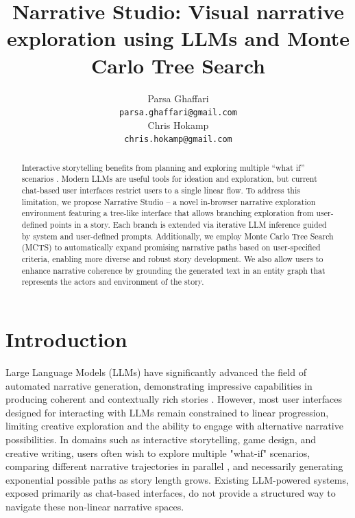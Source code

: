 \documentclass[11pt]{article}
\title{\textbf{Narrative Studio}: Visual narrative exploration using LLMs and Monte Carlo Tree Search}
\author{Parsa Ghaffari \\
  \texttt{parsa.ghaffari@gmail.com} \\\And
  Chris Hokamp \\
  \texttt{chris.hokamp@gmail.com} \\
}
\begin{document}
\maketitle

\begin{abstract}
Interactive storytelling benefits from planning and exploring multiple ``what if'' scenarios \citep{goldfarb-tarrant-etal-2020-content}. Modern LLMs are useful tools for ideation and exploration, but current chat-based user interfaces restrict users to a single linear flow. To address this limitation, we propose Narrative Studio -- a novel in-browser narrative exploration environment featuring a tree-like interface that allows branching exploration from user-defined points in a story. Each branch is extended via iterative LLM inference guided by system and user-defined prompts. Additionally, we employ Monte Carlo Tree Search (MCTS) to automatically expand promising narrative paths based on user-specified criteria, enabling more diverse and robust story development. We also allow users to enhance narrative coherence by grounding the generated text in an entity graph that represents the actors and environment of the story.
\end{abstract}

\section{Introduction}

Large Language Models (LLMs) have significantly advanced the field of automated narrative generation, demonstrating impressive capabilities in producing coherent and contextually rich stories \citep{tian2024largelanguagemodelscapable}. However, most user interfaces designed for interacting with LLMs remain constrained to linear progression, limiting creative exploration and the ability to engage with alternative narrative possibilities. In domains such as interactive storytelling, game design, and creative writing, users often wish to explore multiple "what-if" scenarios, comparing different narrative trajectories in parallel \citep{10.1145/1536513.1536579}, and necessarily generating exponential possible paths as story length grows. Existing LLM-powered systems, exposed primarily as chat-based interfaces, do not provide a structured way to navigate these non-linear narrative spaces.
\end{document}
